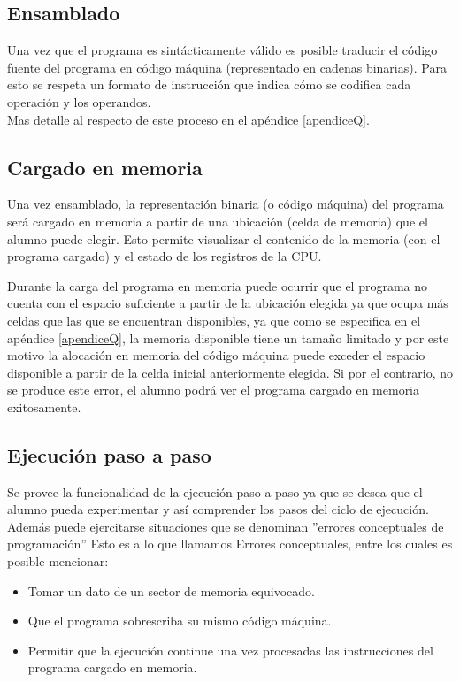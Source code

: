 \subsection{Ensamblado}

Una vez que el programa es sintácticamente válido es posible traducir el código fuente del programa en código máquina (representado en cadenas binarias). Para esto se respeta un formato de instrucción que indica cómo se codifica cada operación y los operandos. \\
Mas detalle al respecto de este proceso en el apéndice \ref{apendiceQ}.

\subsection{Cargado en memoria}

Una vez ensamblado, la representación binaria (o código máquina) del programa será cargado en memoria a partir de una ubicación (celda de memoria) que el alumno puede elegir. Esto permite visualizar el contenido de la memoria (con el programa cargado) y el estado de los registros de la CPU. 

Durante la carga del programa en memoria puede ocurrir que el programa no cuenta con el espacio suficiente a partir de la ubicación elegida ya que ocupa más celdas que las que se encuentran disponibles, ya que como se especifica en el apéndice \ref{apendiceQ}, la memoria disponible tiene un tamaño limitado y por este motivo la alocación en memoria del código máquina puede exceder el espacio disponible a partir de la celda inicial anteriormente elegida. Si por el contrario, no se produce este error, el alumno podrá ver el programa cargado en memoria exitosamente.

\subsection{Ejecución paso a paso}

Se provee la funcionalidad de la ejecución paso a paso ya que se desea que el alumno pueda experimentar y así comprender los pasos del ciclo de ejecución. Además puede ejercitarse situaciones que se denominan ''errores conceptuales de programación'' Esto es a lo que llamamos Errores conceptuales, entre los cuales es posible mencionar:

\begin{itemize}
\item Tomar un dato de un sector de memoria equivocado.
\item Que el programa sobrescriba su mismo código máquina.
\item Permitir que la ejecución continue una vez procesadas las instrucciones del programa cargado en memoria.
\end{itemize}

